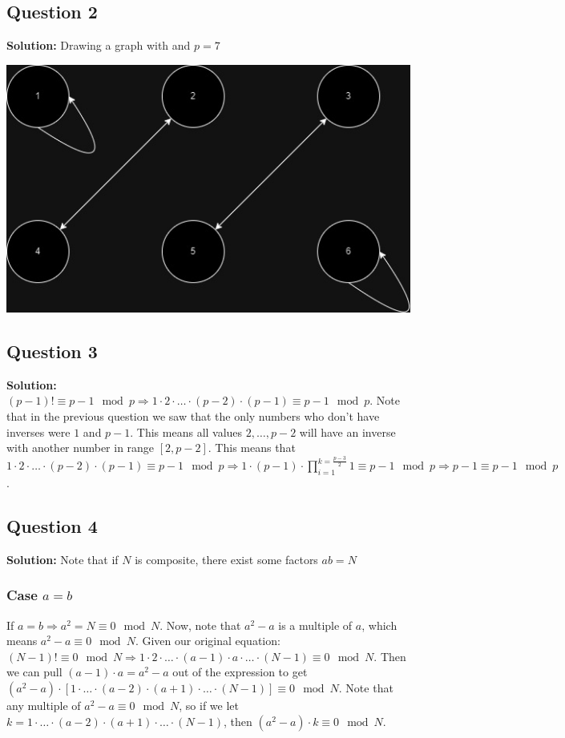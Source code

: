 \documentclass{article}
\begin{document}
\subsection*{Question 2}
\textbf{Solution:} Drawing a graph with and $p=7$ 

\includegraphics[scale=0.5]{graph.jpg}
\newpage
\subsection*{Question 3}
\textbf{Solution:} $(p-1)! \equiv p-1 \mod p \Rightarrow 1\cdot 2 \cdot \ldots \cdot (p-2) \cdot (p-1) \equiv p-1 \mod p$. Note that in the previous question we saw that the only numbers who don't have inverses were $1$ and $p-1$. This means all values $2, \ldots, p-2$ will have an inverse with another number in range $[2, p-2]$. This means that $1\cdot 2 \cdot \ldots \cdot (p-2) \cdot (p-1) \equiv p-1 \mod p \Rightarrow 1\cdot (p-1) \cdot \prod_{i=1}^{k =\frac{p-3}{2}}1 \equiv p-1 \mod p \Rightarrow p-1 \equiv p-1 \mod p$.

\subsection*{Question 4}
\textbf{Solution:} Note that if $N$ is composite, there exist some factors $ab = N$
\subsubsection*{Case $a=b$} If $a=b \Rightarrow a^2 = N \equiv 0 \mod N$. Now, note that $a^2-a$ is a multiple of $a$, which means $a^2-a \equiv 0 \mod N$. Given our original equation: $(N-1)! \equiv 0 \mod N \Rightarrow 1\cdot 2\cdot \ldots \cdot (a-1) \cdot a \cdot \ldots \cdot (N-1) \equiv 0 \mod N$. Then we can pull $(a-1)\cdot a = a^2 -a$ out of the expression to get $(a^2-a) \cdot [1\cdot \ldots \cdot (a-2)\cdot (a+1) \cdot \ldots \cdot (N-1)] \equiv 0 \mod N$. Note that any multiple of $a^2-a \equiv 0 \mod N$, so if we let $k = 1\cdot \ldots \cdot (a-2)\cdot (a+1) \cdot \ldots \cdot (N-1)$, then $(a^2-a)\cdot k \equiv 0 \mod N$.
\end{document}

